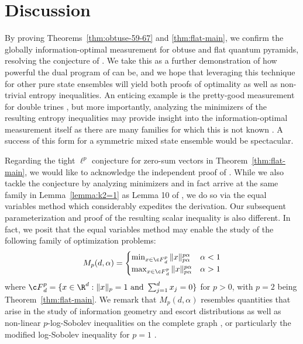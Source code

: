 \documentclass[11pt]{article}
\begin{document}
\section{Discussion}
By proving Theorems~\ref{thm:obtuse-59-67} and \ref{thm:flat-main}, we confirm the globally information-optimal measurement for obtuse and flat quantum pyramids, resolving the conjecture of \citep{englert2010well}. We take this as a further demonstration of how powerful the dual program of \citep{holevo2025quantum} can be, and we hope that leveraging this technique for other pure state ensembles will yield both proofs of optimality as well as non-trivial entropy inequalities. An enticing example is the pretty-good measurement \citep{peres1991optimal} for double trines \citep{decker2009symmetric}, but more importantly, analyzing the minimizers of the resulting entropy inequalities may provide insight into the information-optimal measurement itself as there are many families for which this is not known \citep{dall2014accessible,dall2014tight}. A success of this form for a symmetric mixed state ensemble would be spectacular. 


 Regarding the tight $\ell^p$ conjecture for zero-sum vectors in Theorem~\ref{thm:flat-main}, we would like to acknowledge the independent proof of \citep{zhang2026proof}. While we also tackle the conjecture by analyzing minimizers and in fact arrive at the same family in Lemma~\ref{lemma:k2=1} as Lemma 10 of \citep{zhang2026proof}, we do so via the equal variables method which considerably expedites the derivation. Our subsequent parameterization and proof of the resulting scalar inequality is also different. In fact, we posit that the equal variables method may enable the study of the following family of optimization problems:
 \begin{equation}
     M_p(d,\alpha)=\begin{cases}
         \min_{x\in {\c F}^p_d}\|x\|_{p\alpha}^{p\alpha} & \alpha < 1\\
         \max_{x\in {\c F}^p_d}\|x\|_{p\alpha}^{p\alpha} & \alpha > 1
     \end{cases}
 \end{equation}
 where ${\c F}_d^p=\{x\in \R^d:\|x\|_p=1\text{ and }\sum_{j=1}^d x_j=0\}$ for $p>0$, with $p=2$ being Theorem~\ref{thm:flat-main}. We remark that $M_p(d,\alpha)$ resembles quantities that arise in the study of information geometry and escort distributions \citep{ohara2010dually} as well as non-linear $p$-log-Sobolev inequalities on the complete graph \citep{polyanskiy2019improved, gu2023non}, or particularly the modified log-Sobolev inequality for $p=1$ \citep{bobkov2006modified}. 
 
\end{document}
